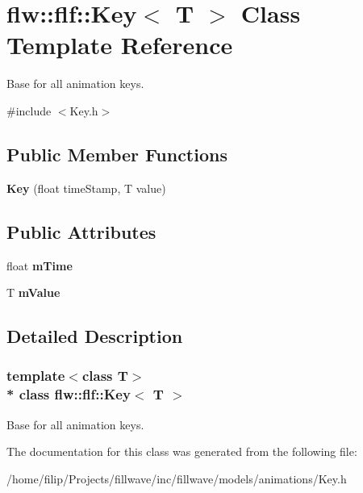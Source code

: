 \hypertarget{classflw_1_1flf_1_1Key}{}\section{flw\+:\+:flf\+:\+:Key$<$ T $>$ Class Template Reference}
\label{classflw_1_1flf_1_1Key}


Base for all animation keys.  




{\ttfamily \#include $<$Key.\+h$>$}

\subsection*{Public Member Functions}
\begin{DoxyCompactItemize}
\item 
{\bfseries Key} (float time\+Stamp, T value)\hypertarget{classflw_1_1flf_1_1Key_a28b10bc048b2761a3e34566e0139111c}{}\label{classflw_1_1flf_1_1Key_a28b10bc048b2761a3e34566e0139111c}

\end{DoxyCompactItemize}
\subsection*{Public Attributes}
\begin{DoxyCompactItemize}
\item 
float {\bfseries m\+Time}\hypertarget{classflw_1_1flf_1_1Key_a935d2e69a4f83e9fbb811069ed38158d}{}\label{classflw_1_1flf_1_1Key_a935d2e69a4f83e9fbb811069ed38158d}

\item 
T {\bfseries m\+Value}\hypertarget{classflw_1_1flf_1_1Key_aba66088ad43b89c391feaf4769d58836}{}\label{classflw_1_1flf_1_1Key_aba66088ad43b89c391feaf4769d58836}

\end{DoxyCompactItemize}


\subsection{Detailed Description}
\subsubsection*{template$<$class T$>$\\*
class flw\+::flf\+::\+Key$<$ T $>$}

Base for all animation keys. 

The documentation for this class was generated from the following file\+:\begin{DoxyCompactItemize}
\item 
/home/filip/\+Projects/fillwave/inc/fillwave/models/animations/Key.\+h\end{DoxyCompactItemize}
